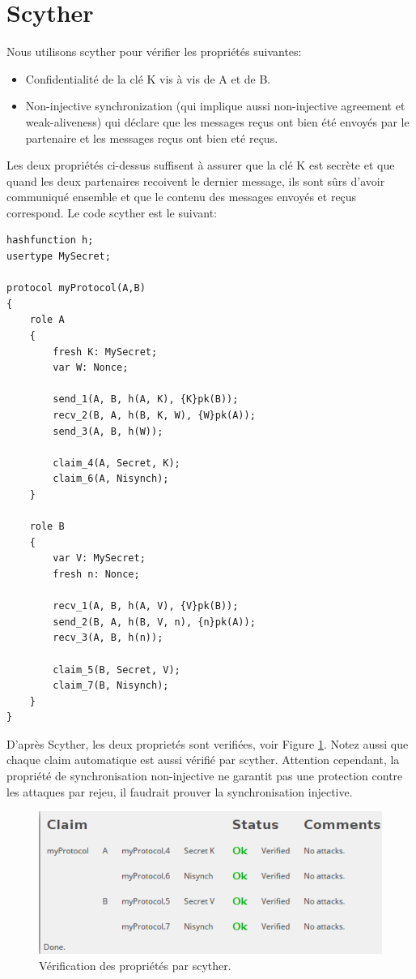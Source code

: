 \documentclass[10pt,a4paper]{article}
\begin{document}
\section{Scyther}
Nous utilisons scyther pour vérifier les propriétés suivantes:
\begin{itemize}
 \item Confidentialité de la clé K vis à vis de A et de B.
 \item Non-injective synchronization (qui implique aussi non-injective agreement et weak-aliveness) qui déclare que les messages reçus ont bien été envoyés par le partenaire et les messages reçus ont bien eté reçus.
\end{itemize}
Les deux propriétés ci-dessus suffisent à assurer que la clé K est secrète et que quand les deux partenaires recoivent le dernier message, ils sont sûrs d'avoir communiqué ensemble et que le contenu des messages envoyés et reçus correspond.
Le code scyther est le suivant:
\begin{Verbatim}[fontsize=\scriptsize]
hashfunction h;
usertype MySecret;

protocol myProtocol(A,B)
{
	role A
	{
		fresh K: MySecret;
		var W: Nonce;

		send_1(A, B, h(A, K), {K}pk(B));
		recv_2(B, A, h(B, K, W), {W}pk(A));
		send_3(A, B, h(W));

		claim_4(A, Secret, K);
		claim_6(A, Nisynch);
	}	
	
	role B
	{
		var V: MySecret;
		fresh n: Nonce;

		recv_1(A, B, h(A, V), {V}pk(B));
		send_2(B, A, h(B, V, n), {n}pk(A));
		recv_3(A, B, h(n));

		claim_5(B, Secret, V);
		claim_7(B, Nisynch);
	}
}
\end{Verbatim}
D'après Scyther, les deux proprietés sont verifiées, voir Figure \ref{fig:scyther_proof}. Notez aussi que chaque claim automatique est aussi vérifié par scyther.
Attention cependant, la propriété de synchronisation non-injective ne garantit pas une protection contre les attaques par rejeu, il faudrait prouver la synchronisation injective.

\begin{figure}[h]
\label{fig:scyther_proof}
\centering
\includegraphics[scale=.5]{scyther_proof}
\caption{Vérification des propriétés par scyther.}
\end{figure}
\end{document}
